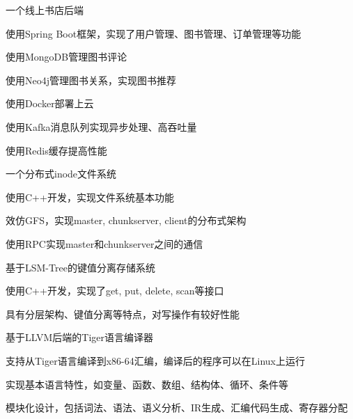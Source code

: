\documentclass[]{deedy-resume-openfont}
\begin{document}
\begin{minipage}[t]{0.73\textwidth}
\begin{tightemize}
    \item 一个线上书店后端
    \item 使用Spring Boot框架，实现了用户管理、图书管理、订单管理等功能
    \item 使用MongoDB管理图书评论
    \item 使用Neo4j管理图书关系，实现图书推荐
    \item 使用Docker部署上云
    \item 使用Kafka消息队列实现异步处理、高吞吐量
    \item 使用Redis缓存提高性能
\end{tightemize}
\sectionsep

\begin{tightemize}
    \item 一个分布式inode文件系统
    \item 使用C++开发，实现文件系统基本功能
    \item 效仿GFS，实现master, chunkserver, client的分布式架构
    \item 使用RPC实现master和chunkserver之间的通信
\end{tightemize}
\sectionsep

\begin{tightemize}
    \item 基于LSM-Tree的键值分离存储系统
    \item 使用C++开发，实现了get, put, delete, scan等接口
    \item 具有分层架构、键值分离等特点，对写操作有较好性能
\end{tightemize}
\sectionsep


\begin{tightemize}
    \item 基于LLVM后端的Tiger语言编译器
    \item 支持从Tiger语言编译到x86-64汇编，编译后的程序可以在Linux上运行
    \item 实现基本语言特性，如变量、函数、数组、结构体、循环、条件等
    \item 模块化设计，包括词法、语法、语义分析、IR生成、汇编代码生成、寄存器分配
\end{tightemize}
\sectionsep


\end{minipage}
\end{document}
